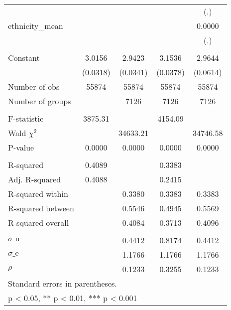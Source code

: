 {\begin{tabular}{l*{4}{c}}
                    &                     &                     &                     &         (.)         \\
ethnicity\_mean      &                     &                     &                     &      0.0000         \\
                    &                     &                     &                     &         (.)         \\
                    &                     &                     &                     &                     \\
Constant            &      3.0156\sym{***}&      2.9423\sym{***}&      3.1536\sym{***}&      2.9644\sym{***}\\
                    &    (0.0318)         &    (0.0341)         &    (0.0378)         &    (0.0614)         \\
\midrule
Number of obs       &       55874         &       55874         &       55874         &       55874         \\
Number of groups    &                     &        7126         &        7126         &        7126         \\
\\ F-statistic      &     3875.31         &                     &     4154.09         &                     \\
Wald $\chi^2$       &                     &    34633.21         &                     &    34746.58         \\
P-value             &      0.0000         &      0.0000         &      0.0000         &      0.0000         \\
\\ R-squared        &      0.4089         &                     &      0.3383         &                     \\
Adj. R-squared      &      0.4088         &                     &      0.2415         &                     \\
R-squared within    &                     &      0.3380         &      0.3383         &      0.3383         \\
R-squared between   &                     &      0.5546         &      0.4945         &      0.5569         \\
R-squared overall   &                     &      0.4084         &      0.3713         &      0.4096         \\
\\ $\sigma\text{\_u}$&                     &      0.4412         &      0.8174         &      0.4412         \\
$\sigma\text{\_e}$   &                     &      1.1766         &      1.1766         &      1.1766         \\
$\rho$              &                     &      0.1233         &      0.3255         &      0.1233         \\
\bottomrule
\multicolumn{5}{l}{\footnotesize Standard errors in parentheses.}\\
\multicolumn{5}{l}{\footnotesize * p < 0.05, ** p < 0.01, *** p < 0.001}\\
\end{tabular}
}
